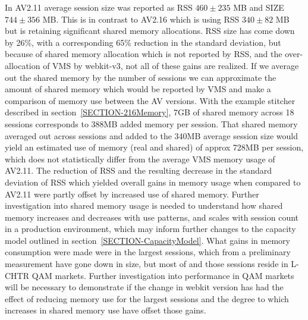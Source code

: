 \documentclass{article}
\begin{document}
In AV2.11 average session size was reported as RSS $460 \pm 235$ MB and SIZE $744 \pm 356$ MB. This is in contrast to AV2.16 which is using RSS $340 \pm 82$ MB but is retaining significant shared memory allocations. RSS size has come down by 26\%, with a corresponding 65\% reduction in the standard deviation, but because of shared memory allocation which is not reported by RSS, and the over-allocation of VMS by webkit-v3, not all of these gains are realized. If we average out the shared memory by the number of sessions we can approximate the amount of shared memory which would be reported by VMS and make a comparison of memory use between the AV versions. With the example stitcher described in section~\ref{SECTION-216Memory}, 7GB of shared memory across 18 sessions corresponds to 388MB added memory per session. That shared memory averaged out across sessions and added to the 340MB average session size would yield an estimated use of memory (real and shared) of approx 728MB per session, which does not statistically differ from the average VMS memory usage of AV2.11. The reduction of RSS and the resulting decrease in the standard deviation of RSS which yielded overall gains in memory usage when compared to AV2.11 were partly offset by increased use of shared memory. Further investigation into shared memory usage is needed to understand how shared memory increases and decreases with use patterns, and scales with session count in a production environment, which may inform further changes to the capacity model outlined in section~\ref{SECTION-CapacityModel}. What gains in memory consumption were made were in the largest sessions, which from a preliminary measurement have gone down in size, but most of and those sessions reside in L-CHTR QAM markets. Further investigation into performance in QAM markets will be necessary to demonstrate if the change in webkit version has had the effect of reducing memory use for the largest sessions and the degree to which increases in shared memory use have offset those gains. 
\end{document}
